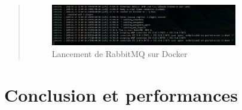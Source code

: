 \documentclass[12pt]{article}
\begin{document}
\begin{quote}
\begin{figure}[h!]
    \centering
    \includegraphics[width=0.8\textwidth]{rabbit_mq.png}
    \caption{Lancement de RabbitMQ sur Docker}
    \label{fig:rabbitmq}
\end{figure}

\end{quote}

\newpage


\section{Conclusion et performances}
\end{document}

